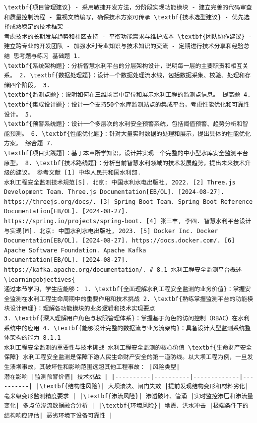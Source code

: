 \begin{verbatim}
\textbf{项目管理建议} - 采用敏捷开发方法，分阶段实现功能模块 - 建立完善的代码审查和质量控制流程 - 重视文档编写，确保技术方案可传承 \textbf{技术选型建议} - 优先选择成熟稳定的技术框架 -
考虑技术的长期发展趋势和社区支持 - 平衡功能需求与维护成本 \textbf{团队协作建议} - 建立跨专业的开发团队 - 加强水利专业知识与技术知识的交流 - 定期进行技术分享和经验总结 思考题与练习 基础题 1.
\textbf{系统架构题}：分析智慧水利平台的分层架构设计，说明每一层的主要职责和相互关系。 2. \textbf{数据处理题}：设计一个数据处理流水线，包括数据采集、校验、处理和存储四个阶段。 3.
\textbf{监测点题}：说明如何在三维场景中定位和展示水利工程的监测点信息。 提高题 4. \textbf{集成设计题}：设计一个支持50个水库监测站点的集成平台，考虑性能优化和可靠性设计。 5.
\textbf{预警系统题}：设计一个多层次的水利安全预警系统，包括阈值预警、趋势分析和智能预测。 6. \textbf{性能优化题}：针对大量实时数据的处理和展示，提出具体的性能优化方案。 综合题 7.
\textbf{项目实践题}：基于本章所学知识，设计并实现一个完整的中小型水库安全监测平台原型。 8. \textbf{技术路线题}：分析当前智慧水利领域的技术发展趋势，提出未来技术升级的建议。 参考文献 [1] 中华人民共和国水利部.
水利工程安全监测技术规范[S]. 北京: 中国水利水电出版社, 2022. [2] Three.js Development Team. Three.js Documentation[EB/OL]. [2024-08-27].
https://threejs.org/docs/. [3] Spring Boot Team. Spring Boot Reference Documentation[EB/OL]. [2024-08-27].
https://spring.io/projects/spring-boot. [4] 张三丰, 李四. 智慧水利平台设计与实现[M]. 北京: 中国水利水电出版社, 2023. [5] Docker Inc. Docker
Documentation[EB/OL]. [2024-08-27]. https://docs.docker.com/. [6] Apache Software Foundation. Apache Kafka
Documentation[EB/OL]. [2024-08-27]. https://kafka.apache.org/documentation/. # 8.1 水利工程安全监测平台概述 \learningobjectives{
通过本节学习，学生应能够： 1. \textbf{全面理解水利工程安全监测的业务价值}：掌握安全监测在水利工程生命周期中的重要作用和技术挑战 2. \textbf{熟练掌握监测平台的功能模块设计原理}：理解各功能模块的业务逻辑和技术实现要点
3. \textbf{深入理解用户角色与权限管理体系}：掌握基于角色的访问控制（RBAC）在水利系统中的应用 4. \textbf{能够设计完整的数据流与业务流架构}：具备设计大型监测系统整体架构的能力 8.1.1
水利工程安全监测的重要性与技术挑战 水利工程安全监测的核心价值 \textbf{生命财产安全保障} 水利工程安全监测是保障下游人民生命财产安全的第一道防线。以大坝工程为例，一旦发生溃坝事故，其破坏性和影响范围远超其他工程事故： |风险类型|
潜在影响 |监测预警价值| 技术挑战 | |----------|----------|-------------|----------| |\textbf{结构性风险}| 大坝溃决、闸门失效 |提前发现结构变形和材料劣化|
毫米级变形监测精度要求 | |\textbf{渗流风险}| 渗透破坏、管涌 |实时监控渗压和渗流量变化| 多点位渗流数据融合分析 | |\textbf{环境风险}| 地震、洪水冲击 |极端条件下的结构响应评估| 恶劣环境下设备可靠性 |

\end{verbatim}
